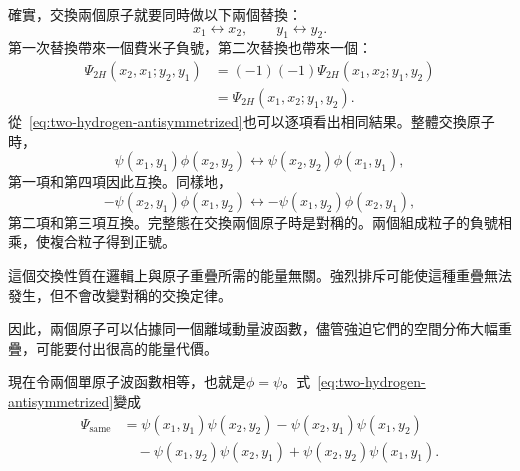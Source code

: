 \begin{classroomqa}
\end{classroomqa}

確實，交換兩個原子就要同時做以下兩個替換：
\begin{equation}
x_1\leftrightarrow x_2,
\qquad
y_1\leftrightarrow y_2.
\end{equation}
第一次替換帶來一個費米子負號，第二次替換也帶來一個：
\begin{equation}
\begin{aligned}
\Psi_{2H}(x_2,x_1;y_2,y_1)
&=(-1)(-1)\Psi_{2H}(x_1,x_2;y_1,y_2)\\
&=\Psi_{2H}(x_1,x_2;y_1,y_2).
\end{aligned}
\end{equation}
從~\eqref{eq:two-hydrogen-antisymmetrized}也可以逐項看出相同結果。整體交換原子時，
\begin{equation}
\psi(x_1,y_1)\phi(x_2,y_2)
\longleftrightarrow
\psi(x_2,y_2)\phi(x_1,y_1),
\end{equation}
第一項和第四項因此互換。同樣地，
\begin{equation}
-\psi(x_2,y_1)\phi(x_1,y_2)
\longleftrightarrow
-\psi(x_1,y_2)\phi(x_2,y_1),
\end{equation}
第二項和第三項互換。完整態在交換兩個原子時是對稱的。兩個組成粒子的負號相乘，使複合粒子得到正號。

這個交換性質在邏輯上與原子重疊所需的能量無關。強烈排斥可能使這種重疊無法發生，但不會改變對稱的交換定律。

\begin{classroomqa}
\end{classroomqa}

因此，兩個原子可以佔據同一個離域動量波函數，儘管強迫它們的空間分佈大幅重疊，可能要付出很高的能量代價。

現在令兩個單原子波函數相等，也就是\(\phi=\psi\)。式~\eqref{eq:two-hydrogen-antisymmetrized}變成
\begin{align}
\Psi_{\mathrm{same}}
&=\psi(x_1,y_1)\psi(x_2,y_2)
-\psi(x_2,y_1)\psi(x_1,y_2)\nonumber\\
&\quad
-\psi(x_1,y_2)\psi(x_2,y_1)
+\psi(x_2,y_2)\psi(x_1,y_1).
\end{align}

